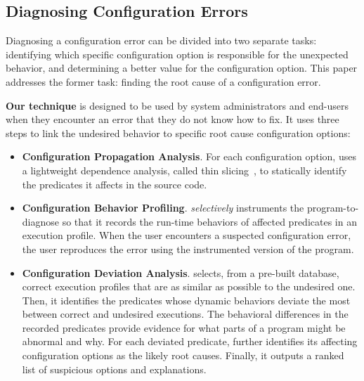 
\subsection{Diagnosing Configuration Errors}

Diagnosing a configuration error can be divided into two
separate tasks: identifying which specific configuration option is
responsible for the unexpected behavior, and determining a better value for
the configuration option. This paper addresses the former task: finding
the root cause of a configuration error.


\textbf{Our technique} is designed to be used by system administrators
and end-users when they encounter an error
that they do not know how to fix. It uses three steps to 
link the undesired behavior to specific root cause configuration options:

\begin{itemize}
\item \textbf{Configuration Propagation Analysis}. For
each configuration option, \ourtool
uses a lightweight dependence analysis, called thin slicing~\cite{Sridharan:2007},
to statically identify the predicates it affects in the source code.

\item \textbf{Configuration Behavior Profiling}. \ourtool
\textit{selectively} instruments the program-to-diagnose
so that it records the run-time behaviors of affected predicates
in an execution profile.
When the user encounters a suspected configuration error, the user
reproduces the error using the instrumented version of the program.

\item \textbf{Configuration Deviation Analysis}.
\ourtool selects, from a pre-built database, correct execution profiles that are as
similar as possible to the undesired one.
Then, it identifies the predicates whose dynamic behaviors deviate the most
between correct and undesired executions.
The behavioral differences in the recorded predicates provide evidence for what parts of a program might be
abnormal and why. %
For each deviated predicate, \ourtool further identifies
its affecting configuration options as the likely root causes.
Finally, it outputs a ranked list of suspicious options and explanations.

\end{itemize}

